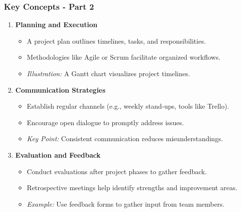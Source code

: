 \documentclass[aspectratio=169]{beamer}
\begin{document}
\begin{frame}[fragile]
    \frametitle{Key Concepts - Part 2}
    \begin{enumerate}[resume]
        \item \textbf{Planning and Execution}
            \begin{itemize}
                \item A project plan outlines timelines, tasks, and responsibilities.
                \item Methodologies like Agile or Scrum facilitate organized workflows.
                \item \textit{Illustration:} A Gantt chart visualizes project timelines.
            \end{itemize}

        \item \textbf{Communication Strategies}
            \begin{itemize}
                \item Establish regular channels (e.g., weekly stand-ups, tools like Trello).
                \item Encourage open dialogue to promptly address issues.
                \item \textit{Key Point:} Consistent communication reduces misunderstandings.
            \end{itemize}

        \item \textbf{Evaluation and Feedback}
            \begin{itemize}
                \item Conduct evaluations after project phases to gather feedback.
                \item Retrospective meetings help identify strengths and improvement areas.
                \item \textit{Example:} Use feedback forms to gather input from team members.
            \end{itemize}
    \end{enumerate}
\end{frame}
\end{document}
